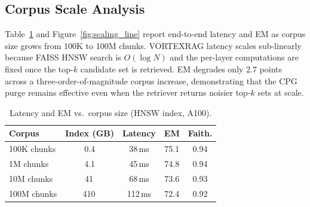 \documentclass[10pt,twocolumn]{article}
\begin{document}
\subsection{Corpus Scale Analysis}

Table~\ref{tab:scaling} and Figure~\ref{fig:scaling_line} report end-to-end
latency and EM as corpus size grows from 100K to 100M chunks.  VORTEXRAG
latency scales sub-linearly because FAISS HNSW search is $O(\log N)$ and
the per-layer computations are fixed once the top-$k$ candidate set is
retrieved.  EM degrades only 2.7 points across a three-order-of-magnitude
corpus increase, demonstrating that the CPG purge remains effective even
when the retriever returns noisier top-$k$ sets at scale.

\begin{table}[h]
\centering
\caption{Latency and EM vs.\ corpus size (HNSW index, A100).}
\label{tab:scaling}
\footnotesize
\setlength{\tabcolsep}{4pt}
\begin{tabular}{@{}lcccc@{}}
\toprule
\textbf{Corpus} & \textbf{Index (GB)} & \textbf{Latency} & \textbf{EM} & \textbf{Faith.} \\
\midrule
100K chunks   & 0.4  & 38\,ms  & 75.1 & 0.94 \\
1M chunks     & 4.1  & 45\,ms  & 74.8 & 0.94 \\
10M chunks    & 41\,  & 68\,ms  & 73.6 & 0.93 \\
100M chunks   & 410\, & 112\,ms & 72.4 & 0.92 \\
\bottomrule
\end{tabular}
\end{table}
\end{document}
